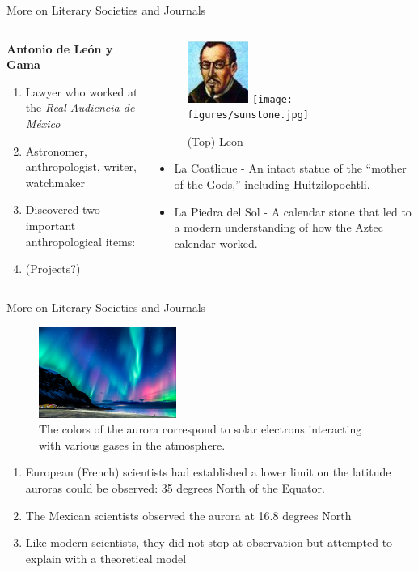 \documentclass{beamer}
\begin{document}
\begin{frame}[fragile]{More on Literary Societies and Journals}
\small
\begin{columns}
\begin{column}{0.5\textwidth}
\textbf{\alert{Antonio de Le\'{o}n y Gama}}
\begin{enumerate}
\item Lawyer who worked at the \textit{Real Audiencia de M\'{e}xico}
\item Astronomer, anthropologist, writer, watchmaker
\item Discovered two important anthropological items:
\item (Projects?)
\end{enumerate}
\end{column}
\begin{column}{0.5\textwidth}
\begin{figure}
\centering
\includegraphics[width=2cm]{figures/leonygama.jpeg}
\texttt{[image: figures/sunstone.jpg]}
\caption{\label{fig:leon} (Top) Leon}
\end{figure}
\begin{itemize}
\item La Coatlicue - An intact statue of the ``mother of the Gods,'' including Huitzilopochtli.
\item La Piedra del Sol - A calendar stone that led to a modern understanding of how the Aztec calendar worked.
\end{itemize}
\end{column}
\end{columns}
\end{frame}

\begin{frame}{More on Literary Societies and Journals}
\small
\begin{figure}
\includegraphics[width=0.4\textwidth]{figures/ab.jpg}
\caption{The colors of the aurora correspond to solar electrons interacting with various gases in the atmosphere.}
\end{figure}
\begin{enumerate}
\item European (French) scientists had established a lower limit on the latitude auroras could be observed: 35 degrees North of the Equator.
\item The Mexican scientists observed the aurora at 16.8 degrees North
\item Like modern scientists, they did not stop at observation but attempted to explain with a theoretical model
\end{enumerate}
\end{frame}
\end{document}

